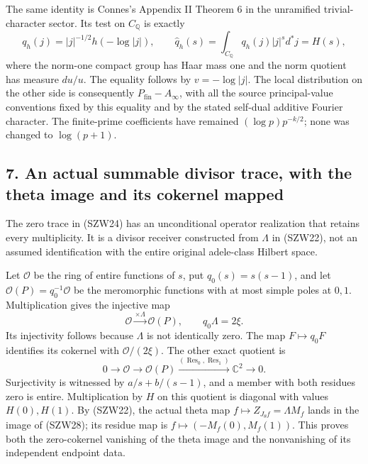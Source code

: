 \documentclass[
  10pt,
  a4paper,
]{article}
\newcounter{none} %
\begin{document}
The same identity is Connes's Appendix II Theorem 6 in the unramified
trivial-character sector. Its test on \(C_{\mathbb Q}\) is exactly \[
q_h(j)=|j|^{-1/2}h(-\log|j|),\qquad
\widehat q_h(s)=\int_{C_{\mathbb Q}}q_h(j)|j|^s d^*j=H(s),
\tag{SZW27}
\] where the norm-one compact group has Haar mass one and the norm
quotient has measure \(du/u\). The equality follows by \(v=-\log|j|\).
The local distribution on the other side is consequently
\(P_{\mathrm{fin}}-A_\infty\), with all the source principal-value
conventions fixed by this equality and by the stated self-dual additive
Fourier character. The finite-prime coefficients have remained
\((\log p)p^{-k/2}\); none was changed to \(\log(p+1)\).

\subsection{7. An actual summable divisor trace, with the theta image
and its cokernel
mapped}\label{an-actual-summable-divisor-trace-with-the-theta-image-and-its-cokernel-mapped}

The zero trace in (SZW24) has an unconditional operator realization that
retains every multiplicity. It is a divisor receiver constructed from
\(\Lambda\) in (SZW22), not an assumed identification with the entire
original adele-class Hilbert space.

Let \(\mathcal O\) be the ring of entire functions of \(s\), put
\(q_0(s)=s(s-1)\), and let \(\mathcal O(P)=q_0^{-1}\mathcal O\) be the
meromorphic functions with at most simple poles at \(0,1\).
Multiplication gives the injective map \[
\mathcal O\xrightarrow{\times\Lambda}\mathcal O(P),\qquad
q_0\Lambda=2\xi.
\tag{SZW28}
\] Its injectivity follows because \(\Lambda\) is not identically zero.
The map \(F\mapsto q_0F\) identifies its cokernel with
\(\mathcal O/(2\xi)\). The other exact quotient is \[
0\to\mathcal O\to\mathcal O(P)
\xrightarrow{(\operatorname{Res}_0,\operatorname{Res}_1)}\mathbb C^2\to0.
\tag{SZW29}
\] Surjectivity is witnessed by \(a/s+b/(s-1)\), and a member with both
residues zero is entire. Multiplication by \(H\) on this quotient is
diagonal with values \(H(0),H(1)\). By (SZW22), the actual theta map
\(f\mapsto Z_{J_\theta f}=\Lambda M_f\) lands in the image of (SZW28);
its residue map is \(f\mapsto(-M_f(0),M_f(1))\). This proves both the
zero-cokernel vanishing of the theta image and the nonvanishing of its
independent endpoint data.
\end{document}
